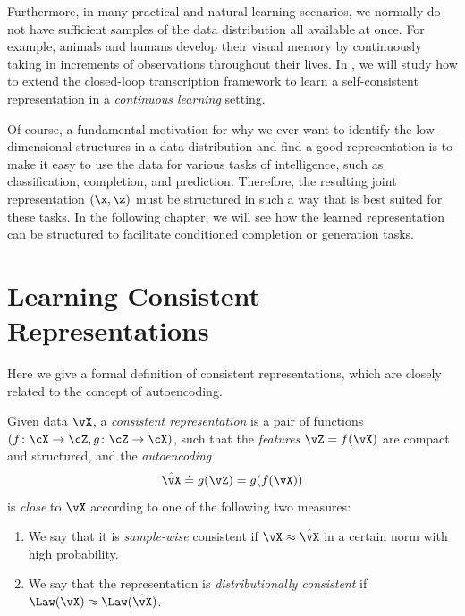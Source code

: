 \documentclass[../../book-main.tex]{subfiles}
\begin{document}
Furthermore, in many practical and natural learning scenarios, we
normally do not have sufficient samples of the data distribution all
available at once. For example, animals and humans develop their
visual memory by continuously taking in increments of observations
throughout their lives. In , we will study how
to extend the closed-loop transcription framework to learn a
self-consistent representation in a {\em continuous learning} setting.

Of course, a fundamental motivation for why we ever want to identify the
low-dimensional structures in a data distribution and find a good
representation is to make it easy to use the data for various tasks
of intelligence, such as classification, completion, and prediction.
Therefore, the resulting joint representation $(\x, \z)$ must be
structured in such a way that is best suited for these tasks. In the
following chapter, we will
see how the learned representation can be structured to facilitate
conditioned completion or generation tasks.

\section{Learning Consistent
Representations}\label{sec:consistent-representation}

Here we give a formal definition of consistent representations, which
are closely related to the concept of autoencoding. %
\begin{definition}\label{def:bidirectional_rep}
    Given data \(\vX\), a \textit{consistent representation} is a pair
    of functions \((f \colon \cX \to \cZ, g \colon \cZ \to \cX)\), such
    that the \textit{features} \(\vZ = f(\vX)\) are compact and
    structured, and the \textit{autoencoding}
    \begin{equation}
        \hat{\vX} \doteq g(\vZ) = g(f(\vX))
    \end{equation}
    is \textit{close} to \(\vX\) according to one of the
    following two measures:
    \begin{enumerate}
        \item We say that it is \textit{sample-wise} consistent if \(\vX
            \approx \hat{\vX}\) in a certain norm with high probability.
        \item We say that the representation is \textit{distributionally
            consistent} if \(\Law(\vX) \approx \Law(\hat{\vX})\).
    \end{enumerate}
\end{definition}
\end{document}
